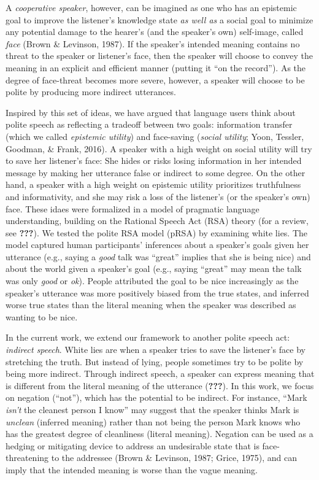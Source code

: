 \documentclass[10pt, letterpaper]{article}
\begin{document}
A \emph{cooperative speaker}, however, can be imagined as one who has an
epistemic goal to improve the listener's knowledge state \emph{as well
as} a social goal to minimize any potential damage to the hearer's (and
the speaker's own) self-image, called \emph{face} (Brown \& Levinson,
1987). If the speaker's intended meaning contains no threat to the
speaker or listener's face, then the speaker will choose to convey the
meaning in an explicit and efficient manner (putting it ``on the
record''). As the degree of face-threat becomes more severe, however, a
speaker will choose to be polite by producing more indirect utterances.

Inspired by this set of ideas, we have argued that language users think
about polite speech as reflecting a tradeoff between two goals:
information transfer (which we called \emph{epistemic utility}) and
face-saving (\emph{social utility}; Yoon, Tessler, Goodman, \& Frank,
2016). A speaker with a high weight on social utility will try to save
her listener's face: She hides or risks losing information in her
intended message by making her utterance false or indirect to some
degree. On the other hand, a speaker with a high weight on epistemic
utility prioritizes truthfulness and informativity, and she may risk a
loss of the listener's (or the speaker's own) face. These idaes were
formalized in a model of pragmatic language understanding, building on
the Rational Speech Act (RSA) theory (for a review, see {\textbf{???}}).
We tested the polite RSA model (pRSA) by examining white lies. The model
captured human participants' inferences about a speaker's goals given
her utterance (e.g., saying a \emph{good} talk was ``great'' implies
that she is being nice) and about the world given a speaker's goal
(e.g., saying ``great'' may mean the talk was only \emph{good} or
\emph{ok}). People attributed the goal to be nice increasingly as the
speaker's utterance was more positively biased from the true states, and
inferred worse true states than the literal meaning when the speaker was
described as wanting to be nice.

In the current work, we extend our framework to another polite speech
act: \emph{indirect speech}. White lies are when a speaker tries to save
the listener's face by stretching the truth. But instead of lying,
people sometimes try to be polite by being more indirect. Through
indirect speech, a speaker can express meaning that is different from
the literal meaning of the utterance ({\textbf{???}}). In this work, we
focus on negation (``not''), which has the potential to be indirect. For
instance, ``Mark \emph{isn't} the cleanest person I know'' may suggest
that the speaker thinks Mark is \emph{unclean} (inferred meaning) rather
than not being the person Mark knows who has the greatest degree of
cleanliness (literal meaning). Negation can be used as a hedging or
mitigating device to address an undesirable state that is
face-threatening to the addressee (Brown \& Levinson, 1987; Grice,
1975), and can imply that the intended meaning is worse than the vague
meaning.
\end{document}
